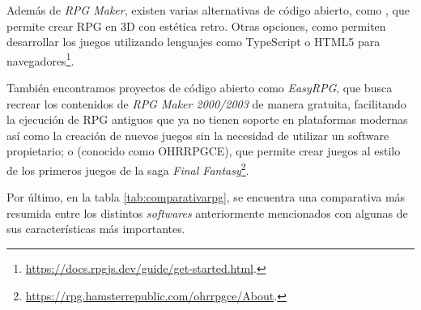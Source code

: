 \bigskip

Además de \textit{RPG Maker}, existen varias alternativas de código abierto, como \cite{rpgpapermaker}, que permite crear RPG en 3D con estética retro. Otras opciones, como \cite{rpgjs} permiten desarrollar los juegos utilizando lenguajes como TypeScript o HTML5 para navegadores\footnote{\url{https://docs.rpgjs.dev/guide/get-started.html}.}.

\smallskip

También encontramos proyectos de código abierto como \textit{EasyRPG}, que busca recrear los contenidos de \textit{RPG Maker 2000/2003} de manera gratuita, facilitando la ejecución de RPG antiguos que ya no tienen soporte en plataformas modernas así como la creación de nuevos juegos sin la necesidad de utilizar un software propietario; o \cite{ohrrpgce} (conocido como OHRRPGCE), que permite crear juegos al estilo de los primeros juegos de la saga \textit{Final Fantasy}\footnote{\url{https://rpg.hamsterrepublic.com/ohrrpgce/About}.}.

\medskip

Por último, en la tabla \ref{tab:comparativarpg}, se encuentra una comparativa más resumida entre los distintos \textit{softwares} anteriormente mencionados con algunas de sus características más importantes.